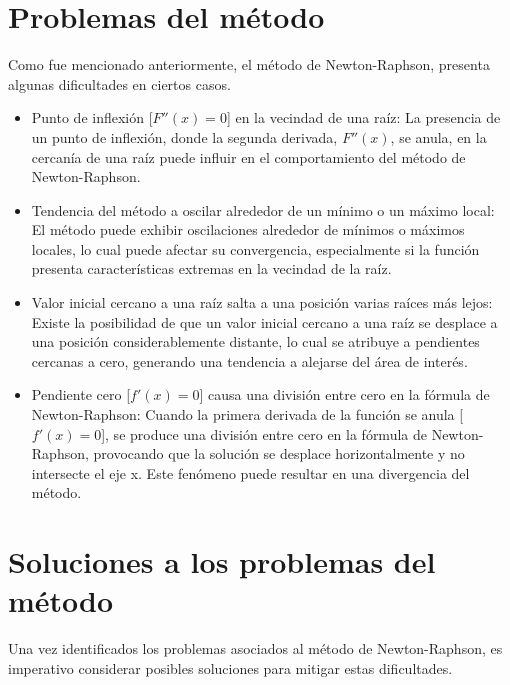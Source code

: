 \documentclass[conference]{IEEEtran}
\begin{document}
\section{Problemas del método}

Como fue mencionado anteriormente, el método de Newton-Raphson, presenta
algunas dificultades en ciertos casos.

\begin{itemize}
	\item Punto de inflexión [$F''(x) = 0$] en la vecindad de una raíz:
	      La presencia de un punto de inflexión, donde la segunda derivada,
	      $F''(x)$, se anula, en la cercanía de una raíz puede influir en
	      el comportamiento del método de Newton-Raphson.

	\item Tendencia del método a oscilar alrededor de un mínimo o un
	      máximo local:
	      El método puede exhibir oscilaciones alrededor de mínimos o
	      máximos locales, lo cual puede afectar su convergencia,
	      especialmente si la función presenta características extremas
	      en la vecindad de la raíz.

	\item Valor inicial cercano a una raíz salta a una posición varias
	      raíces más lejos:
	      Existe la posibilidad de que un valor inicial cercano a una raíz
	      se desplace a una posición considerablemente distante, lo cual
	      se atribuye a pendientes cercanas a cero, generando una tendencia
	      a alejarse del área de interés.

	\item Pendiente cero [$f'(x) = 0$] causa una división entre cero
	      en la fórmula de Newton-Raphson:
	      Cuando la primera derivada de la función se anula [$f'(x) = 0$], se
	      produce una división entre cero en la fórmula de Newton-Raphson,
	      provocando que la solución se desplace horizontalmente y no
	      intersecte el eje x. Este fenómeno puede resultar en una
	      divergencia del método.
\end{itemize}

\section{Soluciones a los problemas del método}

Una vez identificados los problemas asociados al método de Newton-Raphson, es
imperativo considerar posibles soluciones para mitigar estas dificultades.
\end{document}
